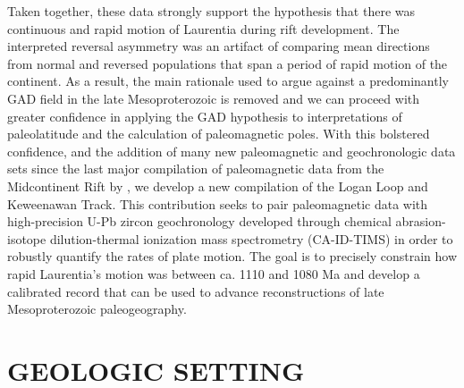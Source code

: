 \documentclass[11pt,letterpaper]{article}
\begin{document}
Taken together, these data strongly support the hypothesis that there was continuous and rapid motion of Laurentia during rift development. The interpreted reversal asymmetry was an artifact of comparing mean directions from normal and reversed populations that span a period of rapid motion of the continent. As a result, the main rationale used to argue against a predominantly GAD field in the late Mesoproterozoic is removed and we can proceed with greater confidence in applying the GAD hypothesis to interpretations of paleolatitude and the calculation of paleomagnetic poles. With this bolstered confidence, and the addition of many new paleomagnetic and geochronologic data sets since the last major compilation of paleomagnetic data from the Midcontinent Rift by \cite{Halls1982a}, we develop a new compilation of the Logan Loop and Keweenawan Track. This contribution seeks to pair paleomagnetic data with high-precision U-Pb zircon geochronology developed through chemical abrasion-isotope dilution-thermal ionization mass spectrometry (CA-ID-TIMS) in order to robustly quantify the rates of plate motion. The goal is to precisely constrain how rapid Laurentia's motion was between ca. 1110 and 1080 Ma and develop a calibrated record that can be used to advance reconstructions of late Mesoproterozoic paleogeography.

\section{GEOLOGIC SETTING}
\end{document}
